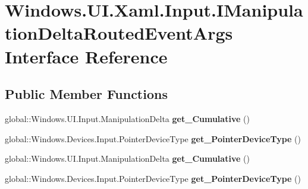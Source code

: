 \hypertarget{interface_windows_1_1_u_i_1_1_xaml_1_1_input_1_1_i_manipulation_delta_routed_event_args}{}\section{Windows.\+U\+I.\+Xaml.\+Input.\+I\+Manipulation\+Delta\+Routed\+Event\+Args Interface Reference}
\label{interface_windows_1_1_u_i_1_1_xaml_1_1_input_1_1_i_manipulation_delta_routed_event_args}
\subsection*{Public Member Functions}
\begin{DoxyCompactItemize}
\item 
\mbox{\label{interface_windows_1_1_u_i_1_1_xaml_1_1_input_1_1_i_manipulation_delta_routed_event_args_aac7701796d3762bf2392d05fad5d7bf4}} 
global\+::\+Windows.\+U\+I.\+Input.\+Manipulation\+Delta {\bfseries get\+\_\+\+Cumulative} ()
\item 
\mbox{\label{interface_windows_1_1_u_i_1_1_xaml_1_1_input_1_1_i_manipulation_delta_routed_event_args_a667503ef934770b5b3a879a6c0955271}} 
global\+::\+Windows.\+Devices.\+Input.\+Pointer\+Device\+Type {\bfseries get\+\_\+\+Pointer\+Device\+Type} ()
\item 
\mbox{\label{interface_windows_1_1_u_i_1_1_xaml_1_1_input_1_1_i_manipulation_delta_routed_event_args_aac7701796d3762bf2392d05fad5d7bf4}} 
global\+::\+Windows.\+U\+I.\+Input.\+Manipulation\+Delta {\bfseries get\+\_\+\+Cumulative} ()
\item 
\mbox{\label{interface_windows_1_1_u_i_1_1_xaml_1_1_input_1_1_i_manipulation_delta_routed_event_args_a667503ef934770b5b3a879a6c0955271}} 
global\+::\+Windows.\+Devices.\+Input.\+Pointer\+Device\+Type {\bfseries get\+\_\+\+Pointer\+Device\+Type} ()
\item 

\end{DoxyCompactItemize}
